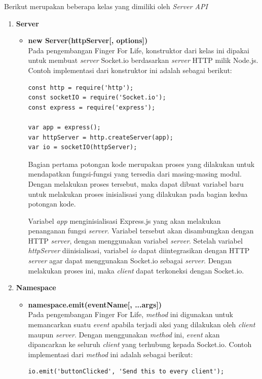 \begin{enumerate}
\begin{enumerate}
		Berikut merupakan beberapa kelas yang dimiliki oleh \textit{Server API}
		\begin{enumerate}
			\item \textbf{Server}
			\begin{itemize}
				\item \textbf{new Server(httpServer[, options])} \\
				Pada pengembangan Finger For Life, konstruktor dari kelas ini dipakai untuk membuat \textit{server} Socket.io berdasarkan \textit{server} HTTP milik Node.js. Contoh implementasi dari konstruktor ini adalah sebagai berikut:
\begin{lstlisting}
const http = require('http');
const socketIO = require('Socket.io');
const express = require('express');

var app = express();
var httpServer = http.createServer(app);
var io = socketIO(httpServer);
\end{lstlisting}

				Bagian pertama potongan kode merupakan proses yang dilakukan untuk mendapatkan fungsi-fungsi yang tersedia dari masing-masing modul. Dengan melakukan proses tersebut, maka dapat dibuat variabel baru untuk melakukan proses inisialisasi yang dilakukan pada bagian kedua potongan kode.

				Variabel \textit{app} menginisialisasi Express.js yang akan melakukan penanganan fungsi \textit{server}. Variabel tersebut akan disambungkan dengan HTTP \textit{server}, dengan menggunakan variabel \textit{server}. Setelah variabel \textit{httpServer} diinisialisasi, variabel \textit{io} dapat diintegrasikan dengan HTTP \textit{server} agar dapat menggunakan Socket.io sebagai \textit{server}. Dengan melakukan proses ini, maka \textit{client} dapat terkoneksi dengan Socket.io.
				
			\end{itemize}
		
			\item \textbf{Namespace}
			\begin{itemize}
				\item \textbf{namespace.emit(eventName[, ...args])} \\
				Pada pengembangan Finger For Life, \textit{method} ini digunakan untuk memancarkan suatu \textit{event} apabila terjadi aksi yang dilakukan oleh \textit{client} maupun \textit{server}. Dengan menggunakan \textit{method} ini, \textit{event} akan dipancarkan ke seluruh \textit{client} yang terhubung kepada Socket.io. Contoh implementasi dari \textit{method} ini adalah sebagai berikut:
\begin{lstlisting}
io.emit('buttonClicked', 'Send this to every client');
\end{lstlisting}


\end{itemize}
\end{enumerate}
\end{enumerate}
\end{enumerate}
